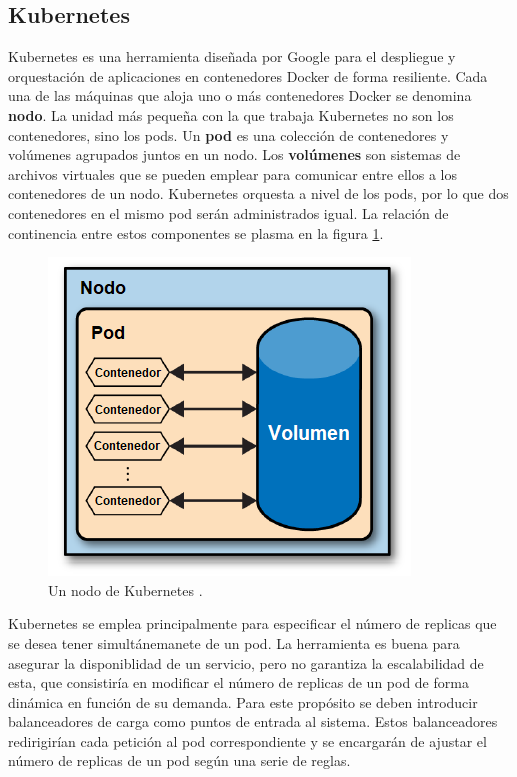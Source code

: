 \documentclass[11pt,spanish,listoffigures]{tfgetsinf}
\begin{document}
\subsection{Kubernetes} \label{subsect:Kubernetes}
Kubernetes \cite{Rensin2015} es una herramienta diseñada por Google para el despliegue y orquestación de aplicaciones en contenedores Docker de forma resiliente. Cada una de las máquinas que aloja uno o más contenedores Docker se denomina \textbf{nodo}. La unidad más pequeña con la que trabaja Kubernetes no son los contenedores, sino los pods. Un \textbf{pod} es una colección de contenedores y volúmenes agrupados juntos en un nodo. Los \textbf{volúmenes} son sistemas de archivos virtuales que se pueden emplear para comunicar entre ellos a los contenedores de un nodo. Kubernetes orquesta a nivel de los pods, por lo que dos contenedores en el mismo pod serán administrados igual. La relación de continencia entre estos componentes se plasma en la figura \ref{fig:kubernetes_ES}.

\begin{figure}[h]
\centering
\includegraphics[scale=0.9]{kubernetes_ES}
\caption{Un nodo de Kubernetes \cite{Rensin2015}.}
\label{fig:kubernetes_ES}
\end{figure}

Kubernetes se emplea principalmente para especificar el número de replicas que se desea tener simultánemanete de un pod. La herramienta es buena para asegurar la disponiblidad de un servicio, pero no garantiza la escalabilidad de esta, que consistiría en modificar el número de replicas de un pod de forma dinámica en función de su demanda. Para este propósito se deben introducir balanceadores de carga como puntos de entrada al sistema. Estos balanceadores redirigirían cada petición al pod correspondiente y se encargarán de ajustar el número de replicas de un pod según una serie de reglas.
\end{document}
